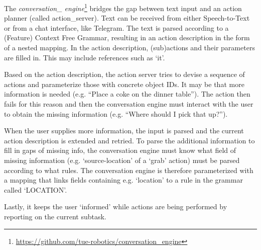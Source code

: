 \label{ssec:conversation}
The \emph{conversation\_ engine}\footnote{\url{https://github.com/tue-robotics/conversation_engine}} bridges the gap between text input and an action planner (called action\_server). Text can be received from either Speech-to-Text or from a chat interface, like Telegram\texttrademark\hspace{0em}.
The text is parsed according to a (Feature) Context Free Grammar, resulting in an action description in the form of a nested mapping. In the action description, (sub)actions and their parameters are filled in. This may include references such as `it'.

Based on the action description, the action server tries to devise a sequence of actions and parameterize those with concrete object IDs. It may be that more information is needed (e.g. ``Place a coke on the dinner table''). The action then fails for this reason and then the conversation engine must interact with the user to obtain the missing information (e.g. ``Where should I pick that up?'').

When the user supplies more information, the input is parsed and the current action description is extended and retried. To parse the additional information to fill in gaps of missing info, the conversation engine must know what field of missing information (e.g. `source-location' of a `grab' action) must be parsed according to what rules. The conversation engine is therefore parameterized with a mapping that links fields containing e.g. `location' to a rule in the grammar called `LOCATION'.

Lastly, it keeps the user `informed' while actions are being performed by reporting on the current subtask.
